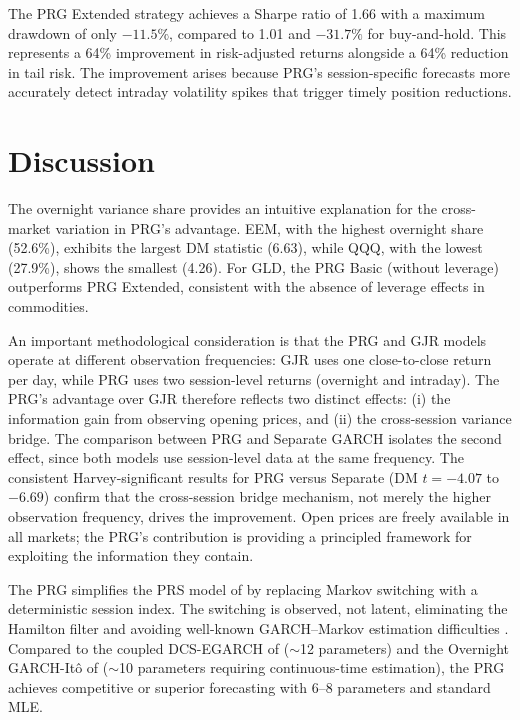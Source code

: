 \documentclass[11pt,a4paper]{article}
\begin{document}
The PRG Extended strategy achieves a Sharpe ratio of 1.66 with a maximum drawdown of only $-11.5\%$, compared to 1.01 and $-31.7\%$ for buy-and-hold. This represents a 64\% improvement in risk-adjusted returns alongside a 64\% reduction in tail risk. The improvement arises because PRG's session-specific forecasts more accurately detect intraday volatility spikes that trigger timely position reductions.


\section{Discussion}

The overnight variance share provides an intuitive explanation for the cross-market variation in PRG's advantage. EEM, with the highest overnight share (52.6\%), exhibits the largest DM statistic (6.63), while QQQ, with the lowest (27.9\%), shows the smallest (4.26). For GLD, the PRG Basic (without leverage) outperforms PRG Extended, consistent with the absence of leverage effects in commodities.

An important methodological consideration is that the PRG and GJR models operate at different observation frequencies: GJR uses one close-to-close return per day, while PRG uses two session-level returns (overnight and intraday). The PRG's advantage over GJR therefore reflects two distinct effects: (i) the information gain from observing opening prices, and (ii) the cross-session variance bridge. The comparison between PRG and Separate GARCH isolates the second effect, since both models use session-level data at the same frequency. The consistent Harvey-significant results for PRG versus Separate (DM $t = -4.07$ to $-6.69$) confirm that the cross-session bridge mechanism, not merely the higher observation frequency, drives the improvement. Open prices are freely available in all markets; the PRG's contribution is providing a principled framework for exploiting the information they contain.

The PRG simplifies the PRS model of \citet{Lai2024} by replacing Markov switching with a deterministic session index. The switching is observed, not latent, eliminating the Hamilton filter and avoiding well-known GARCH--Markov estimation difficulties \citep{Haas2004}. Compared to the coupled DCS-EGARCH of \citet{Linton2020} ($\sim$12 parameters) and the Overnight GARCH-It\^{o} of \citet{Kim2023} ($\sim$10 parameters requiring continuous-time estimation), the PRG achieves competitive or superior forecasting with 6--8 parameters and standard MLE.
\end{document}
